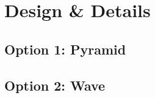 \begin{minipage}[t][\textheight][t]{\linewidth}
	\section*{
	  Design \& Details
	 }
	\vspace{-\baselineskip}%
	\subsection*{
		Option 1: Pyramid
	}
	\makebox[\linewidth][l]{%
		\hspace{\linewidth-0.95\linewidth}
		\begin{minipage}{0.95\linewidth}
			\vspace{-\baselineskip}%
			\noindent
			
		\end{minipage}
	}
	\vfill
	\subsection*{
		Option 2: Wave
	}
	\makebox[\linewidth][l]{%
		\hspace{\linewidth-0.95\linewidth}
		\begin{minipage}{0.95\linewidth}
			\vspace{-\baselineskip}%
			\noindent
			
		\end{minipage}
	}
\end{minipage}
\EndTwoColumnLayout
\newpage
